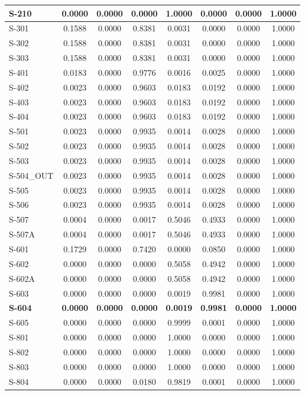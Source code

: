 \documentclass[10pt,letterpaper]{article}
\begin{document}
\begin{landscape}
\begin{xltabular}{\linewidth}{|l|c|c|c|c|c|c|c|}
S-210 & 0.0000 & 0.0000 & 0.0000 & 1.0000 & 0.0000 & 0.0000 & 1.0000 \\ \hline
S-301 & 0.1588 & 0.0000 & 0.8381 & 0.0031 & 0.0000 & 0.0000 & 1.0000 \\ \hline
S-302 & 0.1588 & 0.0000 & 0.8381 & 0.0031 & 0.0000 & 0.0000 & 1.0000 \\ \hline
S-303 & 0.1588 & 0.0000 & 0.8381 & 0.0031 & 0.0000 & 0.0000 & 1.0000 \\ \hline
S-401 & 0.0183 & 0.0000 & 0.9776 & 0.0016 & 0.0025 & 0.0000 & 1.0000 \\ \hline
S-402 & 0.0023 & 0.0000 & 0.9603 & 0.0183 & 0.0192 & 0.0000 & 1.0000 \\ \hline
S-403 & 0.0023 & 0.0000 & 0.9603 & 0.0183 & 0.0192 & 0.0000 & 1.0000 \\ \hline
S-404 & 0.0023 & 0.0000 & 0.9603 & 0.0183 & 0.0192 & 0.0000 & 1.0000 \\ \hline
S-501 & 0.0023 & 0.0000 & 0.9935 & 0.0014 & 0.0028 & 0.0000 & 1.0000 \\ \hline
S-502 & 0.0023 & 0.0000 & 0.9935 & 0.0014 & 0.0028 & 0.0000 & 1.0000 \\ \hline
S-503 & 0.0023 & 0.0000 & 0.9935 & 0.0014 & 0.0028 & 0.0000 & 1.0000 \\ \hline
S-504\_OUT & 0.0023 & 0.0000 & 0.9935 & 0.0014 & 0.0028 & 0.0000 & 1.0000 \\ \hline
S-505 & 0.0023 & 0.0000 & 0.9935 & 0.0014 & 0.0028 & 0.0000 & 1.0000 \\ \hline
S-506 & 0.0023 & 0.0000 & 0.9935 & 0.0014 & 0.0028 & 0.0000 & 1.0000 \\ \hline
S-507 & 0.0004 & 0.0000 & 0.0017 & 0.5046 & 0.4933 & 0.0000 & 1.0000 \\ \hline
S-507A & 0.0004 & 0.0000 & 0.0017 & 0.5046 & 0.4933 & 0.0000 & 1.0000 \\ \hline
S-601 & 0.1729 & 0.0000 & 0.7420 & 0.0000 & 0.0850 & 0.0000 & 1.0000 \\ \hline
S-602 & 0.0000 & 0.0000 & 0.0000 & 0.5058 & 0.4942 & 0.0000 & 1.0000 \\ \hline
S-602A & 0.0000 & 0.0000 & 0.0000 & 0.5058 & 0.4942 & 0.0000 & 1.0000 \\ \hline
S-603 & 0.0000 & 0.0000 & 0.0000 & 0.0019 & 0.9981 & 0.0000 & 1.0000 \\ \hline
\textbf{S-604} & \textbf{0.0000} & \textbf{0.0000} & \textbf{0.0000} & \textbf{0.0019} & \textbf{0.9981} & \textbf{0.0000} & \textbf{1.0000} \\ \hline
S-605 & 0.0000 & 0.0000 & 0.0000 & 0.9999 & 0.0001 & 0.0000 & 1.0000 \\ \hline
S-801 & 0.0000 & 0.0000 & 0.0000 & 1.0000 & 0.0000 & 0.0000 & 1.0000 \\ \hline
S-802 & 0.0000 & 0.0000 & 0.0000 & 1.0000 & 0.0000 & 0.0000 & 1.0000 \\ \hline
S-803 & 0.0000 & 0.0000 & 0.0000 & 1.0000 & 0.0000 & 0.0000 & 1.0000 \\ \hline
S-804 & 0.0000 & 0.0000 & 0.0180 & 0.9819 & 0.0001 & 0.0000 & 1.0000 \\ \hline
\end{xltabular}
\end{landscape}
\end{document}
